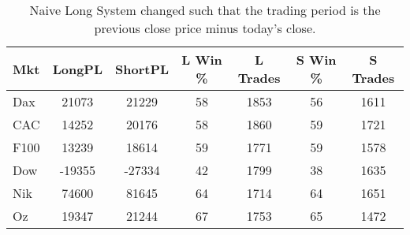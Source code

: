 \begin{table}[ht]
\centering
\caption[Naive Long System - Close to Close]{Naive Long System changed such that the trading period is the previous close price minus today's close.} 
\label{tab:hl_bout_sys}
\begin{tabular}{lcccccc}
  \toprule Mkt & LongPL & ShortPL & L Win \% & L Trades & S Win \% & S Trades \\ 
  \midrule Dax & 21073 & 21229 & 58 & 1853 & 56 & 1611 \\ 
  CAC & 14252 & 20176 & 58 & 1860 & 59 & 1721 \\ 
  F100 & 13239 & 18614 & 59 & 1771 & 59 & 1578 \\ 
  Dow & -19355 & -27334 & 42 & 1799 & 38 & 1635 \\ 
  Nik & 74600 & 81645 & 64 & 1714 & 64 & 1651 \\ 
  Oz & 19347 & 21244 & 67 & 1753 & 65 & 1472 \\ 
   \bottomrule \end{tabular}
\end{table}
